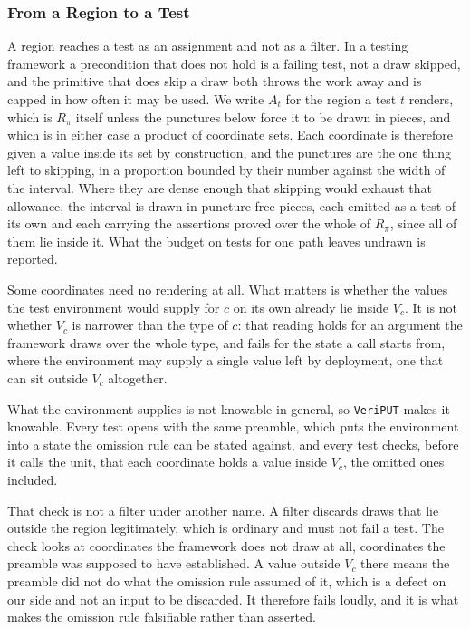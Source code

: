 \documentclass[manuscript,anonymous]{acmart}
\newcommand{\tool}[1]{\texttt{#1}}
\begin{document}
\subsubsection{From a Region to a Test}\label{sec:emit}
A region reaches a test as an assignment and not as a filter. In a testing
framework a precondition that does not hold is a failing test, not a draw
skipped, and the primitive that does skip a draw both throws the work away and
is capped in how often it may be used. We write $A_t$ for the region a test $t$
renders, which is $R_\pi$ itself unless the punctures below force it to be
drawn in pieces, and which is in either case a product of coordinate sets. Each
coordinate is therefore given a value inside its set by construction, and the
punctures are the one thing left to skipping, in a proportion bounded by their
number against the width of the interval. Where they are dense enough that
skipping would exhaust that allowance, the interval is drawn in puncture-free
pieces, each emitted as a test of its own and each carrying the assertions
proved over the whole of $R_\pi$, since all of them lie inside it. What the budget on tests for
one path leaves undrawn is reported.

Some coordinates need no rendering at all. What matters is whether the values
the test environment would supply for $c$ on its own already lie inside $V_c$.
It is not whether $V_c$ is narrower than the type of $c$: that reading holds
for an argument the framework draws over the whole type, and fails for the
state a call starts from, where the environment may supply a single value left
by deployment, one that can sit outside $V_c$ altogether.

What the environment supplies is not knowable in general, so \tool{VeriPUT}
makes it knowable. Every test opens with the same preamble, which puts the
environment into a state the omission rule can be stated against, and every test
checks, before it calls the unit, that each coordinate holds a value inside
$V_c$, the omitted ones included.

That check is not a filter under another name. A filter discards draws that lie
outside the region legitimately, which is ordinary and must not fail a test. The
check looks at coordinates the framework does not draw at all, coordinates the
preamble was supposed to have established. A value outside $V_c$ there means the
preamble did not do what the omission rule assumed of it, which is a defect on
our side and not an input to be discarded. It therefore fails loudly, and it is
what makes the omission rule falsifiable rather than asserted.
\end{document}
